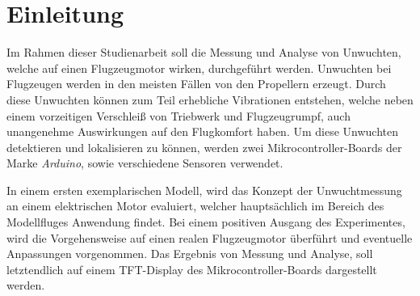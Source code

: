
\chapter{Einleitung}
Im Rahmen dieser Studienarbeit soll die Messung und Analyse von Unwuchten, welche auf einen Flugzeugmotor wirken, durchgeführt werden.
Unwuchten bei Flugzeugen werden in den meisten Fällen von den Propellern erzeugt.
Durch diese Unwuchten können zum Teil erhebliche Vibrationen entstehen, welche neben einem vorzeitigen Verschleiß von Triebwerk und Flugzeugrumpf, auch unangenehme Auswirkungen auf den Flugkomfort haben.
Um diese Unwuchten detektieren und lokalisieren zu können, werden zwei Mikrocontroller-Boards der Marke \textit{Arduino}, sowie verschiedene Sensoren verwendet.

In einem ersten exemplarischen Modell, wird das Konzept der Unwuchtmessung an einem elektrischen Motor evaluiert, welcher hauptsächlich im Bereich des Modellfluges Anwendung findet.
Bei einem positiven Ausgang des Experimentes, wird die Vorgehensweise auf einen realen Flugzeugmotor überführt und eventuelle Anpassungen vorgenommen.
Das Ergebnis von Messung und Analyse, soll letztendlich auf einem TFT-Display des Mikrocontroller-Boards dargestellt werden.